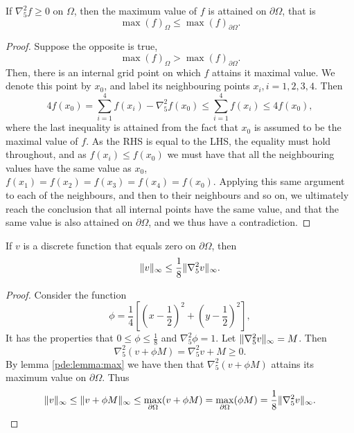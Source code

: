 \begin{lemma}\label{pde:lemma:max}
If $\nabla_5^2 f \geq 0$ on $\Omega$, then the maximum value of $f$ is attained on $\partial \Omega$, that is
$$
\max(f)_\Omega \leq \max(f)_{\partial \Omega}.
$$
\end{lemma}
\begin{proof}
Suppose the opposite is true,
$$
\max(f)_\Omega > \max(f)_{\partial \Omega}.
$$
Then, there is an internal grid point on which $f$ attains it maximal value.
We denote this point by $x_0$, and label its neighbouring points $x_i, i = 1,2,3,4$.
Then
$$
4f(x_0) = \sum_{i=1}^4 f(x_i) - \nabla_5^2 f(x_0) \leq \sum_{i=1}^4 f(x_i) \leq 4 f(x_0),
$$
where the last inequality is attained from the fact that $x_0$ is assumed to be the maximal value of $f$.
As the RHS is equal to the LHS, the equality must hold throughout, and as $f(x_i) \leq f(x_0)$ we must have that all the neighbouring values have the same value as $x_0$, $f(x_1) = f(x_2) = f(x_3) = f(x_4) = f(x_0)$.
Applying this same argument to each of the neighbours, and then to their neighbours and so on, we ultimately reach the conclusion that all internal points have the same value, and that the same value is also attained on $\partial \Omega$, and we thus have a contradiction.
\end{proof}

\begin{lemma}\label{pde:lemma:bound}
If $v$ is a discrete function that equals zero on $\partial \Omega$, then
$$
\lVert v \rVert_\infty \leq \frac18 \lVert \nabla_5^2 v \rVert_\infty.
$$
\end{lemma}
\begin{proof}
Consider the function
$$
\phi = \frac14 [ (x-\frac12)^2 + (y-\frac12)^2 ],
$$
It has the properties that $0 \leq \phi \leq \frac18$ and $\nabla_5^2 \phi = 1$.
Let $\lVert \nabla_5^2 v \rVert_\infty = M$.
Then
$$
\nabla_5^2 (v + \phi M) = \nabla_5^2 v +  M \geq 0.
$$
By lemma \ref{pde:lemma:max} we have then that $\nabla_5^2 (v + \phi M)$ attains its maximum value on $\partial \Omega$.
Thus
$$
\lVert v \rVert_\infty
\leq \lVert v + \phi M \rVert_\infty
\leq \max_{\partial \Omega}(v + \phi M)
= \max_{\partial\Omega} (\phi M)
= \frac18 \lVert \nabla_5^2 v \rVert_\infty.
$$
\end{proof}

